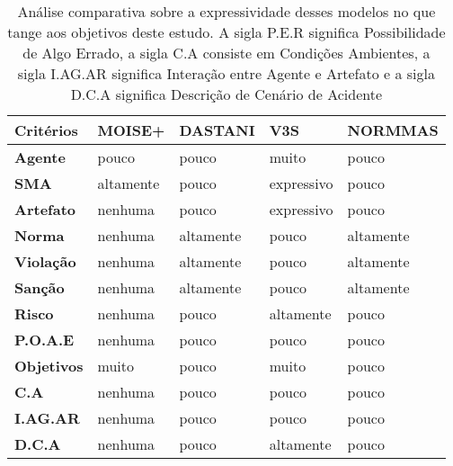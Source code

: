\begin{table}[H]
    \centering
    \begin{tabular}{|l|l|l|l|l|}
        \hline
        \textbf{Critérios} & \textbf{MOISE+}        & \textbf{DASTANI}     & \textbf{V3S}         & \textbf{NORMMAS}          \\ \hline
        \textbf{Agente}    & pouco                  & pouco                & muito                & pouco                     \\ \hline
        \textbf{SMA}       & altamente              & pouco                & expressivo           & pouco                     \\ \hline
        \textbf{Artefato}  & nenhuma                & pouco                & expressivo           & pouco                     \\ \hline
        \textbf{Norma}     & nenhuma                & altamente            & pouco                & altamente                 \\ \hline
        \textbf{Violação}  & nenhuma                & altamente            & pouco                & altamente                 \\ \hline
        \textbf{Sanção}    & nenhuma                & altamente            & pouco                & altamente                 \\ \hline
        \textbf{Risco}     & nenhuma                & pouco                & altamente            & pouco                     \\ \hline
        \textbf{P.O.A.E}   & nenhuma                & pouco                & pouco                & pouco                     \\ \hline
        \textbf{Objetivos} & muito                  & pouco                & muito                & pouco                     \\ \hline
        \textbf{C.A}       & nenhuma                & pouco                & pouco                & pouco                     \\ \hline
        \textbf{I.AG.AR}   & nenhuma                & pouco                & pouco                & pouco                    \\ \hline
        \textbf{D.C.A}     & nenhuma                & pouco                & altamente            & pouco 
    \\ \hline
    \end{tabular}
    \caption{Análise comparativa sobre a expressividade desses modelos no que tange aos objetivos deste estudo. A sigla P.E.R significa Possibilidade de Algo Errado, a sigla C.A consiste em 
    Condições Ambientes, a sigla I.AG.AR significa Interação entre Agente e Artefato e a sigla D.C.A significa Descrição de Cenário de Acidente}
    \label{comparemodel}
\end{table}


